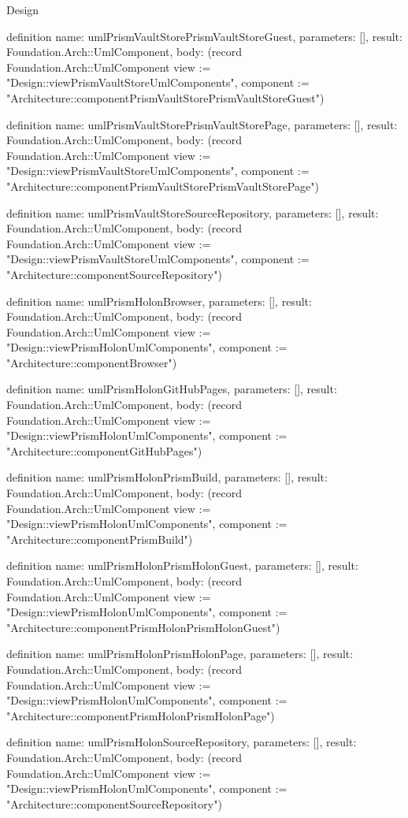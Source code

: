 \begin{lexlean}{Design}
\begin{semanticmodule}
definition{
  name: umlPrismVaultStorePrismVaultStoreGuest,
  parameters: [],
  result: Foundation.Arch::UmlComponent,
  body: (record Foundation.Arch::UmlComponent {view := "Design::viewPrismVaultStoreUmlComponents", component := "Architecture::componentPrismVaultStorePrismVaultStoreGuest"})
}

definition{
  name: umlPrismVaultStorePrismVaultStorePage,
  parameters: [],
  result: Foundation.Arch::UmlComponent,
  body: (record Foundation.Arch::UmlComponent {view := "Design::viewPrismVaultStoreUmlComponents", component := "Architecture::componentPrismVaultStorePrismVaultStorePage"})
}

definition{
  name: umlPrismVaultStoreSourceRepository,
  parameters: [],
  result: Foundation.Arch::UmlComponent,
  body: (record Foundation.Arch::UmlComponent {view := "Design::viewPrismVaultStoreUmlComponents", component := "Architecture::componentSourceRepository"})
}

definition{
  name: umlPrismHolonBrowser,
  parameters: [],
  result: Foundation.Arch::UmlComponent,
  body: (record Foundation.Arch::UmlComponent {view := "Design::viewPrismHolonUmlComponents", component := "Architecture::componentBrowser"})
}

definition{
  name: umlPrismHolonGitHubPages,
  parameters: [],
  result: Foundation.Arch::UmlComponent,
  body: (record Foundation.Arch::UmlComponent {view := "Design::viewPrismHolonUmlComponents", component := "Architecture::componentGitHubPages"})
}

definition{
  name: umlPrismHolonPrismBuild,
  parameters: [],
  result: Foundation.Arch::UmlComponent,
  body: (record Foundation.Arch::UmlComponent {view := "Design::viewPrismHolonUmlComponents", component := "Architecture::componentPrismBuild"})
}

definition{
  name: umlPrismHolonPrismHolonGuest,
  parameters: [],
  result: Foundation.Arch::UmlComponent,
  body: (record Foundation.Arch::UmlComponent {view := "Design::viewPrismHolonUmlComponents", component := "Architecture::componentPrismHolonPrismHolonGuest"})
}

definition{
  name: umlPrismHolonPrismHolonPage,
  parameters: [],
  result: Foundation.Arch::UmlComponent,
  body: (record Foundation.Arch::UmlComponent {view := "Design::viewPrismHolonUmlComponents", component := "Architecture::componentPrismHolonPrismHolonPage"})
}

definition{
  name: umlPrismHolonSourceRepository,
  parameters: [],
  result: Foundation.Arch::UmlComponent,
  body: (record Foundation.Arch::UmlComponent {view := "Design::viewPrismHolonUmlComponents", component := "Architecture::componentSourceRepository"})
}


\end{semanticmodule}
\end{lexlean}
